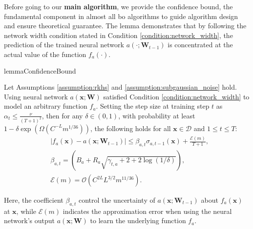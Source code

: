 Before going to our \textbf{main algorithm}, we provide the confidence bound, the fundamental component in almost all \ac{bo} algorithms to guide algorithm design and ensure theoretical guarantee. The lemma demonstrates that by following the network width condition stated in Condition \ref{condition:network_width},  the prediction of the trained neural network $a(\cdot;\mathbf{W}_{t-1})$ is concentrated at the actual value of the function $f_a(\cdot)$. 
\begin{restatable}{lemma}{ConfidenceBound}

\label{lemma:neural-cbo_confidence_bound}
Let Assumptions \ref{assumption:rkhs} and \ref{assumption:subgaussian_noise} hold. Using neural network $a(\mathbf{x}; \mathbf{W})$ satisfied Condition \ref{condition:network_width} to model an arbitrary function $f_a$. Setting the step size at training step $t$ as $\alpha_t \le \frac{\nu}{(T+1)^2}$, then for any $\delta \in (0,1)$,  with probability at least $1 - \delta \exp (\Omega(C^{-L} m^{1/36}))$, the following holds for all $\mathbf{x} \in \mathcal{D}$ and $1 \le t \le T$:
\begin{align*}
     & \lvert f_a(\mathbf{x}) - a(\mathbf{x}; \mathbf{W}_{t-1}) \rvert 
    \le \beta_{a,t} \sigma_{a, t-1}(\mathbf{x}) + \frac{\mathcal{E}(m)}{T+1},
    \\
    & \beta_{a,t} = \left(B_a + R_a \sqrt{\gamma_{t,a} + 2 + 2 \log(1/\delta)}\right),
    \\
    & \mathcal{E}(m) = \mathcal{O}(C^{2L} L^{3/2} m^{11/36}).
\end{align*}
\end{restatable}
Here, the coefficient $\beta_{a,t}$ control the uncertainty of $a(\mathbf{x}; \mathbf{W}_{t-1})$ about $f_a(\mathbf{x})$ at $\mathbf{x}$, while $ \mathcal{E}(m)$ indicates the approximation error when using the neural network's output $a(\mathbf{x}; \boldsymbol{W})$ to learn the underlying function $f_a$.     

